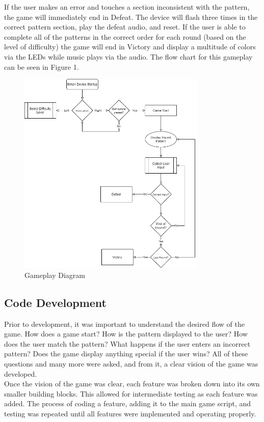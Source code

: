 \documentclass[12pt]{article}
\begin{document}
If the user makes an error and touches a section inconsistent with the pattern, the game will immediately end in Defeat.  The device will flash three times in the correct pattern section, play the defeat audio, and reset.  If the user is able to complete all of the patterns in the correct order for each round (based on the level of difficulty) the game will end in Victory and display a multitude of colors via the LEDs while music plays via the audio. The flow chart for this gameplay can be seen in Figure 1.

\begin{figure}[]
    \centering
    \includegraphics[width = 0.8\textwidth]{AERE_361_Project_Gameplay.png}
    \caption{Gameplay Diagram}
    \label{fig:gameplay}
\end{figure}

\subsection{Code Development} %
Prior to development, it was important to understand the desired flow of the game. How does a game start? How is the pattern displayed to the user? How does the user match the pattern? What happens if the user enters an incorrect pattern? Does the game display anything special if the user wins? All of these questions and many more were asked, and from it, a clear vision of the game was developed.
\vspace*{0.5cm}
\\
Once the vision of the game was clear, each feature was broken down into its own smaller building blocks. This allowed for intermediate testing as each feature was added. The process of coding a feature, adding it to the main game script, and testing was repeated until all features were implemented and operating properly.
\end{document}
